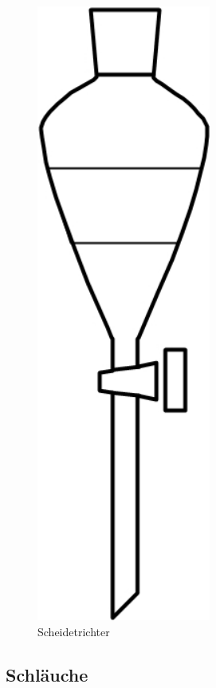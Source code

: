 \begin{figure}[h!]
\begin{minipage}[t]{0.30\textwidth}
		\includegraphics[width=0.51\textwidth]{img/scheidetrichter}
		\caption{Scheidetrichter}
		\label{fig:scheidetrichter}
	\end{minipage}
\end{figure}
\FloatBarrier
\vspace{-7mm}
\subsection{Schläuche}
